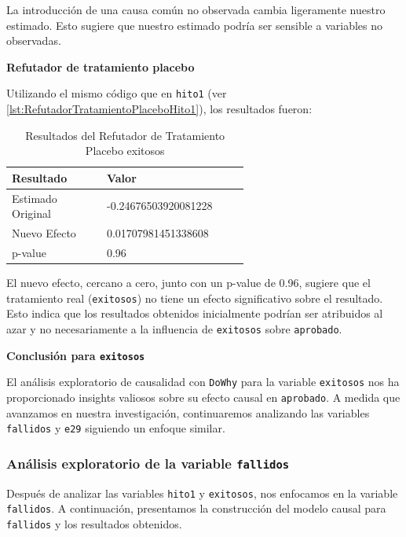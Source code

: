 La introducción de una causa común no observada cambia ligeramente nuestro estimado. Esto sugiere que nuestro estimado podría ser sensible a variables no observadas.

\textbf{Refutador de tratamiento placebo}

Utilizando el mismo código que en \texttt{hito1} (ver \ref{lst:RefutadorTratamientoPlaceboHito1}), los resultados fueron:

\begin{table}[H]
    \centering
    \begin{tabular}{lp{0.6\linewidth}}
        \toprule
        \textbf{Resultado} & \textbf{Valor} \\
        \midrule
        Estimado Original & -0.24676503920081228 \\
        Nuevo Efecto & 0.01707981451338608 \\
        p-value & 0.96 \\
        \bottomrule
    \end{tabular}
    \caption{Resultados del Refutador de Tratamiento Placebo exitosos}
    \label{tab:refutador_placebo_exitosos}
\end{table}

El nuevo efecto, cercano a cero, junto con un p-value de 0.96, sugiere que el tratamiento real (\texttt{exitosos}) no tiene un efecto significativo sobre el resultado. Esto indica que los resultados obtenidos inicialmente podrían ser atribuidos al azar y no necesariamente a la influencia de \texttt{exitosos} sobre \texttt{aprobado}.

\textbf{Conclusión para \texttt{exitosos}}

El análisis exploratorio de causalidad con \texttt{DoWhy} para la variable \texttt{exitosos} nos ha proporcionado insights valiosos sobre su efecto causal en \texttt{aprobado}. A medida que avanzamos en nuestra investigación, continuaremos analizando las variables \texttt{fallidos} y \texttt{e29} siguiendo un enfoque similar.

\subsubsection{Análisis exploratorio de la variable \texttt{fallidos}}

Después de analizar las variables \texttt{hito1} y \texttt{exitosos}, nos enfocamos en la variable \texttt{fallidos}. A continuación, presentamos la construcción del modelo causal para \texttt{fallidos} y los resultados obtenidos.

